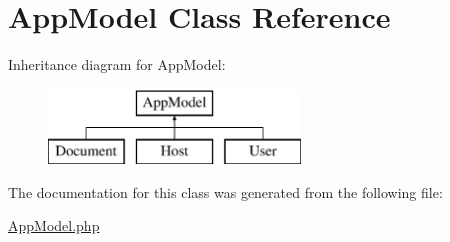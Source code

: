 \hypertarget{classAppModel}{
\section{\-App\-Model \-Class \-Reference}
\label{classAppModel}
}
\-Inheritance diagram for \-App\-Model\-:\begin{figure}[H]
\begin{center}
\leavevmode
\includegraphics[height=2.000000cm]{classAppModel}
\end{center}
\end{figure}


\-The documentation for this class was generated from the following file\-:\begin{DoxyCompactItemize}
\item 
\hyperlink{AppModel_8php}{\-App\-Model.\-php}\end{DoxyCompactItemize}
